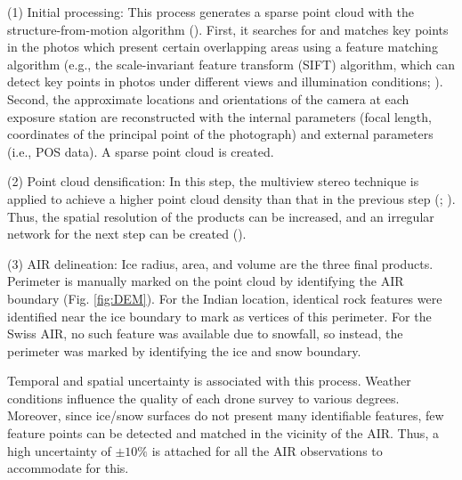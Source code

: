 (1) Initial processing: This process generates a sparse point cloud with the structure-from-motion algorithm
(\cite{turnerAutomatedTechniqueGenerating2012}). First, it searches for and matches key points in the photos which present certain overlapping
areas using a feature matching algorithm (e.g., the scale-invariant feature transform (SIFT) algorithm, which can
detect key points in photos under different views and illumination conditions;
\cite{loweDistinctiveImageFeatures2004}). Second, the approximate locations and orientations of the camera at
each exposure station are reconstructed with the internal parameters (focal length, coordinates of the principal
point of the photograph) and external parameters (i.e., POS data). A sparse point cloud is created.

(2) Point cloud densification: In this step, the multiview stereo technique is applied to achieve a higher
point cloud density than that in the previous step (\cite{furukawaAccurateDenseRobust2010};
\cite{molgStructurefromMotionUsingHistorical2017}). Thus, the spatial resolution of the products can be
increased, and an irregular network for the next step can be created (\cite{kungACCURACYAUTOMATICPHOTOGRAMMETRIC2011}).

(3) \ac{AIR} delineation: Ice radius, area, and volume are the three final products. Perimeter is manually marked
on the point cloud by identifying the \ac{AIR} boundary (Fig. \ref{fig:DEM}). For the Indian location, identical rock features were identified
near the ice boundary to mark as vertices of this perimeter. For the Swiss \ac{AIR}, no such feature was available due
to snowfall, so instead, the perimeter was marked by identifying the ice and snow boundary.

Temporal and spatial uncertainty is associated with this process. Weather conditions influence the quality
of each drone survey to various degrees. Moreover, since ice/snow surfaces do not present many identifiable features, few
feature points can be detected and matched in the vicinity of the \ac{AIR}. Thus, a high uncertainty of
$\pm 10 \%$ is attached for all the \ac{AIR} observations to accommodate for this.

